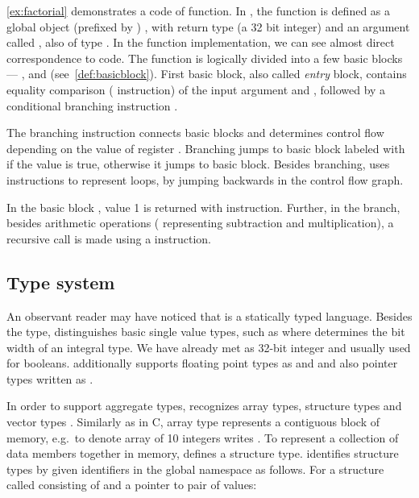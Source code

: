 \autoref{ex:factorial} demonstrates a code of  function. In
\LLVM, the  function is defined as a global object (prefixed by
)  , with
return type  (a 32 bit integer) and an argument called ,
also of type . In the function implementation, we can see almost
direct correspondence to \Cpp{} code.  The function is logically divided into a
few basic blocks --- ,  and 
(see~\autoref{def:basicblock}). First basic block, also called \emph{entry}
block, contains equality comparison ( instruction) of the input
argument  and , followed by a conditional branching
instruction .

The branching instruction connects basic blocks and determines control flow
depending on the value of register . Branching jumps to basic
block labeled with  if the value  is true,
otherwise it jumps to  basic block. Besides branching, \LLVM
uses  instructions to represent loops, by jumping backwards in the
control flow graph.

In the basic block , value 1 is returned with 
instruction. Further, in the  branch, besides arithmetic operations
( representing subtraction and  multiplication), a
recursive call is made using a  instruction.

\subsection{Type system} \label{subsec:typesystem}

An observant reader may have noticed that \LLVMIR is a statically typed
language.  Besides the  type, \LLVM distinguishes basic single value
types, such as  where  determines the bit width of an integral
type. We have already met  as 32-bit integer and  usually
used for booleans.  \LLVM additionally supports floating point types as
 and  and also pointer types written as .

In order to support aggregate types, \LLVM recognizes array types, structure types
and vector types \cite{LLVM:langref}. Similarly as in C, array type represents a
contiguous block of memory, e.g.~to denote array of 10 integers
\LLVM writes \code{[10 × i32]}. To represent a collection of data members
together in memory, \LLVM defines a structure type. \LLVM identifies structure types
by given identifiers in the global namespace as follows. For a structure called
 consisting of  and a pointer to pair of 
values:

